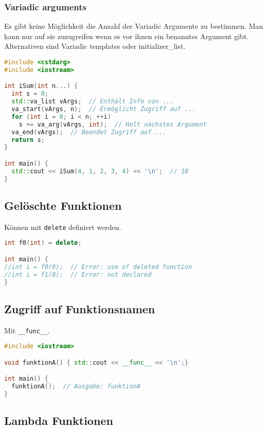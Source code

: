 \documentclass[10pt,twocolumn]{scrartcl}
\begin{document}
\subsubsection{Variadic arguments}

Es gibt keine Möglichkeit die Anzahl der Variadic Argumente zu bestimmen. Man
kann nur auf sie zuzugreifen wenn es vor ihnen ein benanntes Argument gibt.
Alternativen sind Variadic templates oder initializer\_list.

\begin{lstlisting}[language=C++]
#include <cstdarg>
#include <iostream>

int iSum(int n...) {
  int s = 0;
  std::va_list vArgs;  // Enthält Info von ...
  va_start(vArgs, n);  // Ermöglicht Zugriff auf ...
  for (int i = 0; i < n; ++i)
    s += va_arg(vArgs, int);  // Holt nächstes Argument
  va_end(vArgs);  // Beendet Zugriff auf ...
  return s;
}

int main() {
  std::cout << iSum(4, 1, 2, 3, 4) << '\n';  // 10
}
\end{lstlisting}

\subsection{Gelöschte Funktionen}

Können mit \lstinline|delete| definiert werden.

\begin{lstlisting}[language=C++]
int f0(int) = delete;

int main() {
//int i = f0(0);  // Error: use of deleted function
//int i = f1(0);  // Error: not declared
}
\end{lstlisting}

\subsection{Zugriff auf Funktionsnamen}

Mit \lstinline|__func__|.

\begin{lstlisting}[language=C++]
#include <iostream>

void funktionA() { std::cout << __func__ << '\n';}

int main() {
  funktionA();  // Ausgabe: funktionA
}
\end{lstlisting}

\subsection{Lambda Funktionen}
\end{document}
